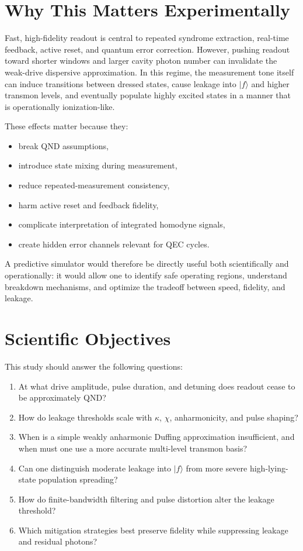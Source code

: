 \documentclass[11pt]{article}
\begin{document}
\section{Why This Matters Experimentally}

Fast, high-fidelity readout is central to repeated syndrome extraction, real-time feedback,
active reset, and quantum error correction. However, pushing readout toward shorter windows
and larger cavity photon number can invalidate the weak-drive dispersive approximation. In
this regime, the measurement tone itself can induce transitions between dressed states,
cause leakage into $|f\rangle$ and higher transmon levels, and eventually populate highly
excited states in a manner that is operationally ionization-like.

These effects matter because they:
\begin{itemize}[leftmargin=2em]
    \item break QND assumptions,
    \item introduce state mixing during measurement,
    \item reduce repeated-measurement consistency,
    \item harm active reset and feedback fidelity,
    \item complicate interpretation of integrated homodyne signals,
    \item create hidden error channels relevant for QEC cycles.
\end{itemize}

A predictive simulator would therefore be directly useful both scientifically and
operationally: it would allow one to identify safe operating regions, understand breakdown
mechanisms, and optimize the tradeoff between speed, fidelity, and leakage.

\section{Scientific Objectives}

This study should answer the following questions:

\begin{enumerate}[leftmargin=2em]
    \item At what drive amplitude, pulse duration, and detuning does readout cease to be
    approximately QND?
    \item How do leakage thresholds scale with $\kappa$, $\chi$, anharmonicity, and pulse
    shaping?
    \item When is a simple weakly anharmonic Duffing approximation insufficient, and when
    must one use a more accurate multi-level transmon basis?
    \item Can one distinguish moderate leakage into $|f\rangle$ from more severe
    high-lying-state population spreading?
    \item How do finite-bandwidth filtering and pulse distortion alter the leakage
    threshold?
    \item Which mitigation strategies best preserve fidelity while suppressing leakage and
    residual photons?
\end{enumerate}
\end{document}
